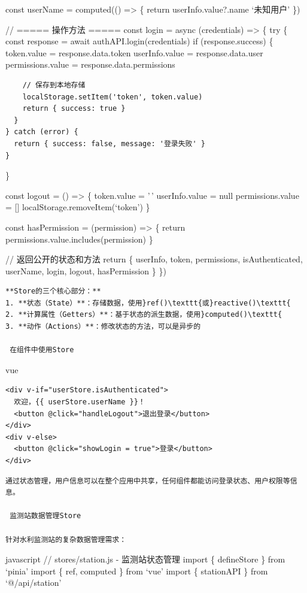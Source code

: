 {{const userName = computed(() =\textgreater{} \{ return userInfo.value?.name \textbar\textbar{} `未知用户' \})

// ===== 操作方法 ===== const login = async (credentials) =\textgreater{} \{ try \{ const response = await authAPI.login(credentials) if (response.success) \{ token.value = response.data.token userInfo.value = response.data.user permissions.value = response.data.permissions

\begin{verbatim}
    // 保存到本地存储
    localStorage.setItem('token', token.value)
    return { success: true }
  }
} catch (error) {
  return { success: false, message: '登录失败' }
}
\end{verbatim}

\}

const logout = () =\textgreater{} \{ token.value = '\,' userInfo.value = null permissions.value = {[}{]} localStorage.removeItem(`token') \}

const hasPermission = (permission) =\textgreater{} \{ return permissions.value.includes(permission) \}

// 返回公开的状态和方法 return \{ userInfo, token, permissions, isAuthenticated, userName, login, logout, hasPermission \} \})

\begin{lstlisting}
**Store的三个核心部分：**
1. **状态（State）**：存储数据，使用}ref()\texttt{或}reactive()\texttt{
2. **计算属性（Getters）**：基于状态的派生数据，使用}computed()\texttt{
3. **动作（Actions）**：修改状态的方法，可以是异步的

 在组件中使用Store
\end{lstlisting}

vue

\begin{verbatim}
<div v-if="userStore.isAuthenticated">
  欢迎，{{ userStore.userName }}！
  <button @click="handleLogout">退出登录</button>
</div>
<div v-else>
  <button @click="showLogin = true">登录</button>
</div>
\end{verbatim}

\begin{lstlisting}
通过状态管理，用户信息可以在整个应用中共享，任何组件都能访问登录状态、用户权限等信息。

 监测站数据管理Store

针对水利监测站的复杂数据管理需求：
\end{lstlisting}

javascript // stores/station.js - 监测站状态管理 import \{ defineStore \} from `pinia' import \{ ref, computed \} from `vue' import \{ stationAPI \} from `@/api/station'

}}

